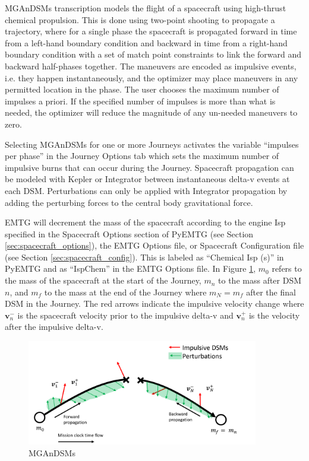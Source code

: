     \acf{MGAnDSMs} transcription models the flight of a spacecraft using high-thrust chemical propulsion. This is done using two-point shooting to propagate a trajectory, where for a single phase the spacecraft is propagated forward in time from a left-hand boundary condition and backward in time from a right-hand boundary condition with a set of match point constraints to link the forward and backward half-phases together. The maneuvers are encoded as impulsive events, i.e. they happen instantaneously, and the optimizer may place maneuvers in any permitted location in the phase. The user chooses the maximum number of impulses a priori. If the specified number of impulses is more than what is needed, the optimizer will reduce the magnitude of any un-needed maneuvers to zero.     

    \noindent Selecting \ac{MGAnDSMs} for one or more Journeys activates the variable ``impulses per phase'' in the Journey Options tab which sets the maximum number of impulsive burns that can occur during the Journey. Spacecraft propagation can be modeled with Kepler or Integrator between instantaneous delta-v events at each DSM. Perturbations can only be applied with Integrator propagation by adding the perturbing forces to the central body gravitational force. 

    \noindent \ac{EMTG} will decrement the mass of the spacecraft according to the engine Isp specified in the Spacecraft Options section of PyEMTG (see Section \ref{sec:spacecraft_options}), the \ac{EMTG} Options file, or Spacecraft Configuration file (see Section \ref{sec:spacecraft_config}). This is labeled as ``Chemical Isp (s)'' in PyEMTG and as ``IspChem'' in the \ac{EMTG} Options file. In Figure \ref{fig:MGAnDSMs_mission_type}, $m_0$ refers to the mass of the spacecraft at the start of the Journey, $m_n$ to the mass after DSM $n$, and $m_f$ to the mass at the end of the Journey where $m_N = m_f$ after the final DSM in the Journey. The red arrows indicate the impulsive velocity change where $\mathbf{v}_n^-$ is the spacecraft velocity prior to the impulsive delta-v and $\mathbf{v}_n^+$ is the velocity after the impulsive delta-v.

    \begin{figure}[H]
        \centering
        \includegraphics[width=0.9\textwidth]{../../shared_latex_inputs/images/mgandsms.png}
        \caption{\acf{MGAnDSMs}}
        \label{fig:MGAnDSMs_mission_type}
    \end{figure}

